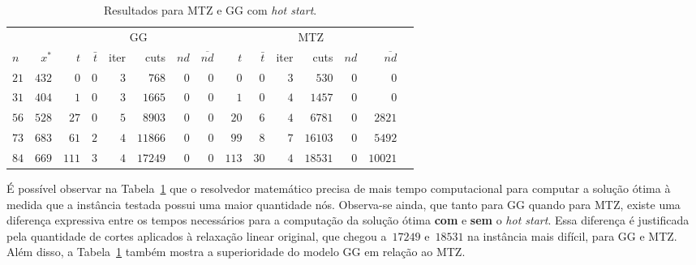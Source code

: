 \documentclass{article}
\begin{document}
\begin{table}[h]
	\centering
	\caption{Resultados para MTZ e GG com \textsl{hot start}.\label{tab:q1}}
	\begin{tabular}{lrrrrrrrrrrrrrr}
		\toprule
		     &         & \multicolumn{6}{c}{GG} & \multicolumn{6}{c}{MTZ}                                                                                                         \\
		\cmidrule(lr){3-8}  \cmidrule(lr) {9-14}
		$n$  & $x^{*}$ & $t$                    & $\bar{t}$               & iter & cuts    & $nd$ & $\overline{nd}$ & $t$   & $\bar{t}$ & iter & cuts    & $nd$ & $\overline{nd}$ \\
		\midrule
		$21$ & $432$   & $0$                    & $0$                     & $3$  & $768$   & $0$  & $0$             & $0$   & $0$       & $3$  & $530$   & $0$  & $0$             \\
		$31$ & $404$   & $1$                    & $0$                     & $3$  & $1665$  & $0$  & $0$             & $1$   & $0$       & $4$  & $1457$  & $0$  & $0$             \\
		$56$ & $528$   & $27$                   & $0$                     & $5$  & $8903$  & $0$  & $0$             & $20$  & $6$       & $4$  & $6781$  & $0$  & $2821$          \\
		$73$ & $683$   & $61$                   & $2$                     & $4$  & $11866$ & $0$  & $0$             & $99$  & $8$       & $7$  & $16103$ & $0$  & $5492$          \\
		$84$ & $669$   & $111$                  & $3$                     & $4$  & $17249$ & $0$  & $0$             & $113$ & $30$      & $4$  & $18531$ & $0$  & $10021$         \\
		\bottomrule
	\end{tabular}
\end{table}

É possível observar na Tabela~\ref{tab:q1} que o resolvedor matemático precisa de mais tempo computacional para computar a solução ótima à medida que a instância testada possui uma maior quantidade nós.
Observa-se ainda, que tanto para GG quando para MTZ, existe uma diferença expressiva entre os tempos necessários para a computação da solução ótima \textbf{com} e \textbf{sem} o \textsl{hot start}.
Essa diferença é justificada pela quantidade de cortes aplicados à relaxação linear original, que chegou a~$17249$ e~$18531$ na instância mais difícil, para GG e MTZ.
Além disso, a Tabela~\ref{tab:q1} também mostra a superioridade do modelo GG em relação ao MTZ.
\end{document}
